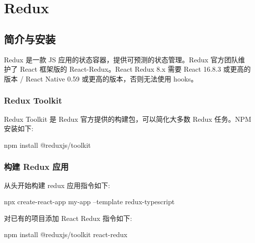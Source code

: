 \section{Redux}

\subsection{简介与安装}

Redux 是一款 JS 应用的状态容器，提供可预测的状态管理。Redux 官方团队维护了 React 框架版的 React-Redux。React Redux 8.x 需要 React 16.8.3 或更高的版本 / React Native 0.59 或更高的版本，否则无法使用 hooks。

\subsubsection*{Redux Toolkit}

Redux Toolkit 是 Redux 官方提供的构建包，可以简化大多数 Redux 任务。NPM 安装如下:

\begin{bash}
npm install @reduxjs/toolkit
\end{bash}

\subsubsection*{构建 Redux 应用}

从头开始构建 redux 应用指令如下:

\begin{bash}
npx create-react-app my-app --template redux-typescript
\end{bash}

对已有的项目添加 React Redux 指令如下:

\begin{bash}
npm install @reduxjs/toolkit react-redux
\end{bash}


\newpage